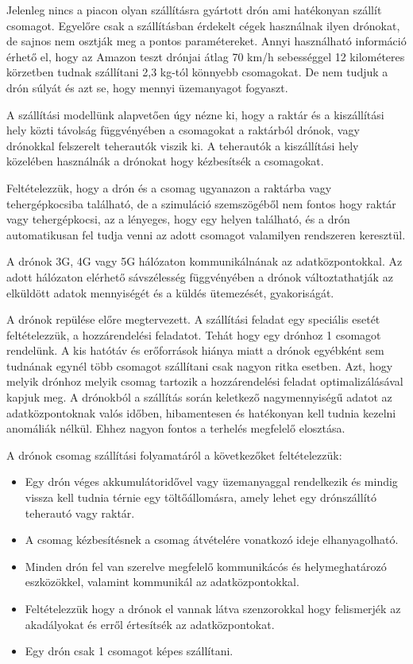 Jelenleg nincs a piacon olyan szállításra gyártott drón ami hatékonyan szállít csomagot. Egyelőre csak a szállításban
érdekelt cégek használnak ilyen drónokat, de sajnos nem osztják meg a pontos paramétereket. Annyi használható
információ érhető el, hogy az Amazon teszt drónjai átlag 70 km/h sebességgel 12 kilométeres körzetben tudnak szállítani
2,3 kg-tól könnyebb csomagokat.
De nem tudjuk a drón súlyát és azt se, hogy mennyi üzemanyagot fogyaszt.


A szállítási modellünk alapvetően úgy nézne ki, hogy a raktár és a kiszállítási hely közti távolság függvényében a csomagokat a raktárból drónok, vagy drónokkal felszerelt teherautók viszik ki.
A teherautók a kiszállítási hely közelében használnák a drónokat hogy kézbesítsék a csomagokat.

Feltételezzük, hogy a drón és a csomag ugyanazon a raktárba vagy tehergépkocsiba található, de a szimuláció szemszögéből nem fontos hogy raktár vagy tehergépkocsi, az a lényeges, hogy egy helyen található, és a drón automatikusan fel tudja venni az adott csomagot
valamilyen rendszeren keresztül.

A drónok 3G, 4G vagy 5G hálózaton kommunikálnának az adatközpontokkal.
Az adott hálózaton elérhető sávszélesség függvényében a drónok változtathatják az elküldött adatok mennyiségét és a küldés ütemezését, gyakoriságát.

A drónok repülése előre megtervezett. A szállítási feladat egy speciális esetét feltételezzük, a hozzárendelési feladatot.
Tehát hogy egy drónhoz 1 csomagot rendelünk. A kis hatótáv és erőforrások hiánya miatt a drónok egyébként sem tudnának egynél több csomagot szállítani csak nagyon ritka esetben.
Azt, hogy melyik drónhoz melyik csomag tartozik a hozzárendelési feladat optimalizálásával kapjuk meg.
A drónokból a szállítás során keletkező nagymennyiségű adatot az adatközpontoknak valós időben, hibamentesen
és hatékonyan kell tudnia kezelni anomáliák nélkül.
Ehhez nagyon fontos a terhelés megfelelő elosztása.

A drónok csomag szállítási folyamatáról a következőket feltételezzük:
\begin{itemize}
    \item Egy drón  véges akkumulátoridővel vagy üzemanyaggal rendelkezik és mindig vissza kell tudnia térnie egy töltőállomásra, amely lehet egy drónszállító teherautó vagy raktár.
    \item A csomag kézbesítésnek a csomag átvételére vonatkozó ideje elhanyagolható.
    \item Minden drón fel van szerelve megfelelő kommunikácós és helymeghatározó eszközökkel, valamint kommunikál az adatközpontokkal.
    \item Feltételezzük hogy a drónok el vannak látva szenzorokkal hogy felismerjék az akadályokat és erről értesítsék az adatközpontokat.
    \item Egy drón csak 1 csomagot képes szállítani.
\end{itemize}

